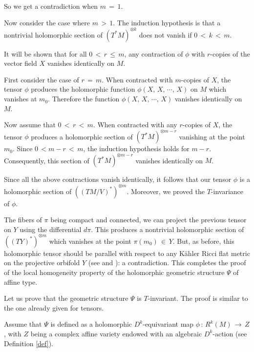 \documentclass[12pt,reqno]{amsart}
\theoremstyle{definition}
\numberwithin{equation}{section}
\begin{document}
So we get a contradiction when $m\,=\,1$.

Now consider the case where $m\,>\,1$. The induction hypothesis is that a nontrivial holomorphic section of 
$(T^*M)^{\otimes k}$ does not vanish if $0\,<\,k\,<\,m$.

It will be shown that for all $0 \,<\, r \,\leq\, m$, any contraction of $\phi$ with $r$-copies of the
vector field $X$ vanishes identically on $M$.

First consider the case of $r\,=\,m$. When contracted with $m$-copies of $X$, the tensor $\phi$ produces 
the holomorphic function $\phi(X,\,X,\, \cdots,\,X)$ on $M$ which vanishes at $m_0$. Therefore the function 
$\phi(X,\,X,\, \cdots,\,X)$ vanishes identically on $M$.

Now assume that $0\,<\,r\,<\,m$. When contracted with any $r$-copies of $X$, the tensor $\phi$
produces a holomorphic section of $(T^*M)^{\otimes m-r}$ vanishing at the point $m_0$. Since $0\, < m-r\, <\,
m$, the induction hypothesis holds for $m-r$. Consequently, this section of $(T^*M)^{\otimes m-r}$ vanishes
identically on $M$.

Since all the above contractions vanish identically, it follows that our tensor $\phi$ is a holomorphic 
section of $((TM/V)^*)^{\otimes m}$. Moreover, we proved the $T$-invariance of $\phi$.

The fibers of $\pi$ being compact and connected, we can project the previous tensor on $Y$ using the 
differential $d \pi$. This produces a nontrivial holomorphic section of $((TY)^*)^{\otimes m}$ which 
vanishes at the point $\pi(m_0) \,\in\, Y$. But, as before, this holomorphic tensor should be parallel with 
respect to any K\"ahler Ricci flat metric on the projective orbifold $Y$ (see \cite[Theorem 8.2]{GGK} and 
\cite[Theorem A]{CGGN}): a contradiction. This completes the proof of the local homogeneity property of the 
holomorphic geometric structure $\Psi$ of affine type.

Let us prove that the geometric structure $\Psi$ is $T$-invariant. The proof is similar to the one 
already given for tensors.

Assume that $\Psi$ is defined as a holomorphic $D^k$-equivariant map $\phi\, :\, R^k(M) \,\longrightarrow\, 
Z$, with $Z$ being a complex affine variety endowed with an algebraic $D^k$-action (see Definition 
\ref{def}).
\end{document}
